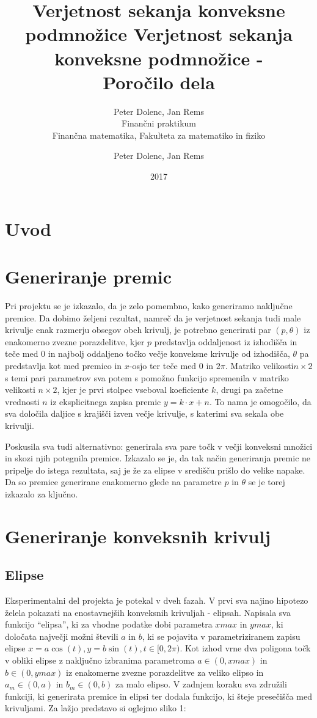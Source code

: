 \documentclass[a4paper]{article}
\title{Verjetnost sekanja konveksne podmnožice}
\author{Peter Dolenc, Jan Rems \\ Finančni praktikum \\ Finančna matematika, Fakulteta za matematiko in fiziko}
\date{2017}
\begin{document}
\title{%
  Verjetnost sekanja konveksne podmnožice -\\
   \large Poročilo dela \\}

\author{Peter Dolenc, Jan Rems}

\maketitle

\pagebreak

\section{Uvod}
\section{Generiranje premic}
Pri projektu se je izkazalo, da je zelo pomembno, kako generiramo naključne premice. Da dobimo željeni rezultat, namreč da je verjetnost sekanja tudi male krivulje enak razmerju obsegov obeh krivulj, je potrebno generirati par $(p, \theta)$ iz enakomerno zvezne porazdelitve, kjer $p$ predstavlja oddaljenost iz izhodišča in teče med $0$ in najbolj oddaljeno točko večje konveksne krivulje od izhodišča, $\theta$ pa predstavlja kot med premico in $x$-osjo ter teče med $0$ in $2\pi$. Matriko velikosti$n\times2$ s temi pari parametrov sva potem s pomožno funkcijo spremenila v matriko velikosti $n\times2$, kjer je prvi stolpec vseboval koeficiente $k$, drugi pa začetne vrednosti $n$ iz eksplicitnega zapisa premic $y=k\cdot x+n$. To nama je omogočilo, da sva določila daljice s krajišči izven večje krivulje, s katerimi sva sekala obe krivulji.

Poskusila sva tudi alternativno: generirala sva pare točk v večji konveksni množici in skozi njih potegnila premice. Izkazalo se je, da tak način generiranja premic ne pripelje do istega rezultata, saj je že za elipse v središču prišlo do velike napake. Da so premice generirane enakomerno glede na parametre $p$ in $\theta$ se je torej izkazalo za ključno.

\section{Generiranje konveksnih krivulj}
\subsection{Elipse}
Eksperimentalni del projekta je potekal v dveh fazah. V prvi sva najino hipotezo želela pokazati na enostavnejših konveksnih krivuljah - elipsah. Napisala sva funkcijo ``elipsa'', ki za vhodne podatke dobi parametra $xmax$ in $ymax$, ki določata največji možni števili $a$ in $b$, ki se pojavita v parametriziranem zapisu elipse $x=a \cos(t), y=b \sin(t), t\in [0, 2\pi)$. Kot izhod vrne dva poligona točk v obliki elipse z naključno izbranima parametroma $a \in (0, xmax)$ in $b \in (0, ymax)$ iz enakomerne zvezne porazdelitve za veliko elipso in $a_m \in (0, a)$ in $b_m \in (0, b)$ za malo elipso. V zadnjem koraku sva združili funkciji, ki generirata premice in elipsi ter dodala funkcijo, ki šteje presečišča med krivuljami. Za lažjo predstavo si oglejmo sliko 1:
\end{document}
